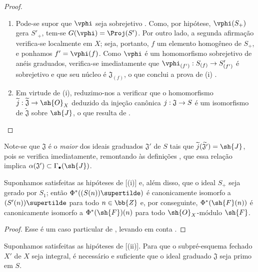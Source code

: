 \documentclass[oneside,10pt]{amsart}
\makeatletter
\newcommand{\ega@arrow}[2]{\mathchoice{#1}{#2}{#2}{#2}}
\renewcommand{\to}{\ega@arrow{\longrightarrow}{\rightarrow}}
\newcommand{\oldpage}[2][]{\marginnote{\normalfont\footnotesize\textbf{#1}~|~#2}\ignorespaces}
\let\EGAOriginalLabel\label
\renewcommand{\label}[1]{\phantomsection\EGAOriginalLabel{#1}}
\makeatother
\begin{document}
\begin{proof}
\medskip\noindent
\begin{enumerate}
  \item[{\rm(i)}] Pode-se supor que $\vphi$ seja sobrejetivo .
    Como, por hipótese, $\vphi(S_+)$ gera $S'_+$, tem-se $G(\vphi)=\Proj(S')$.
    Por outro lado, a segunda afirmação verifica-se localmente em $X$;
    seja, portanto, $f$ um elemento homogêneo de $S_+$, e ponhamos $f'=\vphi(f)$.
    Como $\vphi$ é um homomorfismo sobrejetivo de anéis graduados, verifica-se imediatamente que $\vphi_{(f')}:S_{(f)}\to S'_{(f')}$ é sobrejetivo e que seu núcleo é $\mathfrak{J}_{(f)}$, o que conclui a prova de (i) .
  \item[{\rm(ii)}] Em virtude de (i), reduzimo-nos a verificar que o homomorfismo $\widetilde{j}:\widetilde{\mathfrak{J}}\to\sh{O}_X$ deduzido da injeção canônica $j:\mathfrak{J}\to S$ é um isomorfismo de $\widetilde{\mathfrak{J}}$ sobre $\sh{J}$, o que resulta de .
\end{enumerate}
\end{proof}

Note-se que $\mathfrak{J}$ é o \emph{maior} dos ideais graduados $\mathfrak{J}'$ de $S$ tais que $\widetilde{j}(\widetilde{\mathfrak{J'}})=\sh{J}$, pois se verifica imediatamente, remontando às definições , que essa relação implica $\alpha(\mathfrak{J}')\subset\Gamma_\bullet(\sh{J})$.

\begin{corollary}[2.9.3]
\label{II.2.9.3}
Suponhamos satisfeitas as hipóteses de [(i)] e, além disso, que o ideal $S_+$ seja gerado por $S_1$;
então $\Phi^*((S(n))\supertilde)$ é canonicamente isomorfo a $(S'(n))\supertilde$ para todo $n\in\bb{Z}$ e, por conseguinte, $\Phi^*(\sh{F}(n))$ é canonicamente isomorfo a $\Phi^*(\sh{F})(n)$ para todo $\sh{O}_X$-módulo $\sh{F}$.
\end{corollary}

\begin{proof}
Esse é um caso particular de , levando em conta .
\end{proof}

\begin{corollary}[2.9.4]
\label{II.2.9.4}
Suponhamos satisfeitas as hipóteses de [(ii)].
Para que o subpré-esquema fechado $X'$ de $X$ seja integral, é necessário e suficiente que o ideal graduado $\mathfrak{J}$ seja primo em $S$.
\end{corollary}
\oldpage[II]{49}
\end{document}
